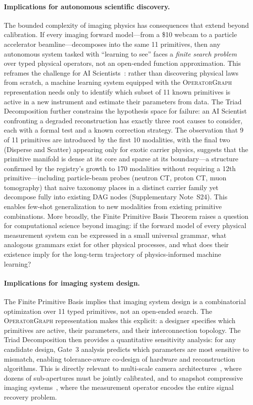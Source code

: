 \documentclass[11pt]{article}
\newcommand{\opg}{\textsc{OperatorGraph}}
\begin{document}
\paragraph{Implications for autonomous scientific discovery.}
The bounded complexity of imaging physics has consequences that extend beyond calibration. If every imaging forward model---from a \$10 webcam to a particle accelerator beamline---decomposes into the same 11 primitives, then any autonomous system tasked with ``learning to see'' faces a \emph{finite search problem} over typed physical operators, not an open-ended function approximation. This reframes the challenge for AI Scientists~\cite{wang2023scientific}: rather than discovering physical laws from scratch, a machine learning system equipped with the \opg{} representation needs only to identify which subset of 11 known primitives is active in a new instrument and estimate their parameters from data. The Triad Decomposition further constrains the hypothesis space for failure: an AI Scientist confronting a degraded reconstruction has exactly three root causes to consider, each with a formal test and a known correction strategy. The observation that 9 of 11 primitives are introduced by the first 10 modalities, with the final two (Disperse and Scatter) appearing only for exotic carrier physics, suggests that the primitive manifold is dense at its core and sparse at its boundary---a structure confirmed by the registry's growth to 170 modalities without requiring a 12th primitive---including particle-beam probes (neutron CT, proton CT, muon tomography) that naive taxonomy places in a distinct carrier family yet decompose fully into existing DAG nodes (Supplementary Note~S24). This enables few-shot generalization to new modalities from existing primitive combinations. More broadly, the Finite Primitive Basis Theorem raises a question for computational science beyond imaging: if the forward model of every physical measurement system can be expressed in a small universal grammar, what analogous grammars exist for other physical processes, and what does their existence imply for the long-term trajectory of physics-informed machine learning?

\paragraph{Implications for imaging system design.}
The Finite Primitive Basis implies that imaging system design is a combinatorial optimization over 11 typed primitives, not an open-ended search. The \opg{} representation makes this explicit: a designer specifies which primitives are active, their parameters, and their interconnection topology. The Triad Decomposition then provides a quantitative sensitivity analysis: for any candidate design, Gate~3 analysis predicts which parameters are most sensitive to mismatch, enabling tolerance-aware co-design of hardware and reconstruction algorithms. This is directly relevant to multi-scale camera architectures~\cite{brady2012multiscale}, where dozens of sub-apertures must be jointly calibrated, and to snapshot compressive imaging systems~\cite{yuan2021sci}, where the measurement operator encodes the entire signal recovery problem.
\end{document}
